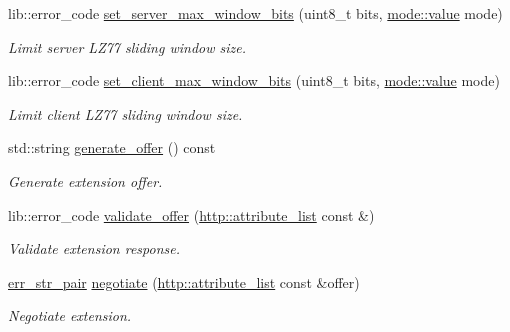 \begin{DoxyCompactItemize}
lib\+::error\+\_\+code \hyperlink{classwebsocketpp_1_1extensions_1_1permessage__deflate_1_1enabled_ac2f1bd776c26b4d54afaceded1841394}{set\+\_\+server\+\_\+max\+\_\+window\+\_\+bits} (uint8\+\_\+t bits, \hyperlink{namespacewebsocketpp_1_1extensions_1_1permessage__deflate_1_1mode_ae06aef93260cb0b5f5bd729a82564120}{mode\+::value} mode)
\begin{DoxyCompactList}\small\item\em Limit server L\+Z77 sliding window size. \end{DoxyCompactList}\item 
lib\+::error\+\_\+code \hyperlink{classwebsocketpp_1_1extensions_1_1permessage__deflate_1_1enabled_a5bfcf29752865c0e9c8e8092ee21b5af}{set\+\_\+client\+\_\+max\+\_\+window\+\_\+bits} (uint8\+\_\+t bits, \hyperlink{namespacewebsocketpp_1_1extensions_1_1permessage__deflate_1_1mode_ae06aef93260cb0b5f5bd729a82564120}{mode\+::value} mode)
\begin{DoxyCompactList}\small\item\em Limit client L\+Z77 sliding window size. \end{DoxyCompactList}\item 
std\+::string \hyperlink{classwebsocketpp_1_1extensions_1_1permessage__deflate_1_1enabled_adfdebb1b57ffe1a9e667e983ff933390}{generate\+\_\+offer} () const 
\begin{DoxyCompactList}\small\item\em Generate extension offer. \end{DoxyCompactList}\item 
lib\+::error\+\_\+code \hyperlink{classwebsocketpp_1_1extensions_1_1permessage__deflate_1_1enabled_acf45724e34c174a0b8a5166192f659de}{validate\+\_\+offer} (\hyperlink{namespacewebsocketpp_1_1http_a9744f4104772b987aa9e86c35ce1357b}{http\+::attribute\+\_\+list} const \&)
\begin{DoxyCompactList}\small\item\em Validate extension response. \end{DoxyCompactList}\item 
\hyperlink{namespacewebsocketpp_abecf95d53c9387716b157daae84441f3}{err\+\_\+str\+\_\+pair} \hyperlink{classwebsocketpp_1_1extensions_1_1permessage__deflate_1_1enabled_aa05eda4f6a0231c13708445480181ff4}{negotiate} (\hyperlink{namespacewebsocketpp_1_1http_a9744f4104772b987aa9e86c35ce1357b}{http\+::attribute\+\_\+list} const \&offer)
\begin{DoxyCompactList}\small\item\em Negotiate extension. \end{DoxyCompactList}\item 

\end{DoxyCompactItemize}
